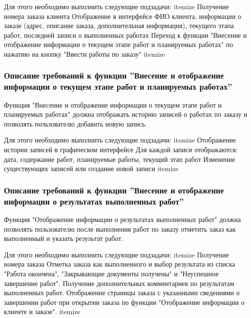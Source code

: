 \documentclass[russian, utf8, 12pt,pointsubsection,floatsubsection]{eskdtext}
\begin{document}
Для этого необходимо выполнить следующие подзадачи:
itemize
Получение номера заказа клиента
Отображение в интерфейсе ФИО клиента, информации о заказе (адрес, описание заказа, дополнительная информация), текущего этапа работ, последней записи о выполненных работах
Переход к функции "Внесение и отображение информации о текущем этапе работ и планируемых работах" по нажатию на кнопку "Ввести работы по заказу"
itemize

\subsubsection{Описание требований к функции ''Внесение и отображение информации о текущем этапе работ и планируемых работах''}
Функция "Внесение и отображение информации о текущем этапе работ и планируемых работах" должна отображать историю записей о работах по заказу и позволять пользователю добавить новую запись. 

Для этого необходимо выполнить следующие подзадачи:
itemize
Отображение истории записей в графическом интерфейсе
Для каждой записи отображаются: дата, содержание работ, планируемые работы, текущий этап работ
Изменение существующих записей или создание новой записи
itemize

\subsubsection{Описание требований к функции ''Внесение и отображение информации о результатах выполненных работ''}
Функция "Отображение информации о результатах выполненных работ" должна позволять пользователю после выполнения работ по заказу отметить заказ как выполненный и указать результат работ.

Для этого необходимо выполнить следующие подзадачи:
itemize
Получение номера заказа
Отметка заказа как выполненного и выбор результата из списка "Работа окончена", "Закрывающие документы получены" и "Неуспешное завершение работ".
Получение дополнительных комментариев по результатам выполненных работ.
Отображение страницы заказа с указанными сведениями о завершении работ при открытии заказа по функции "Отображение информации о клиенте и заказе".
itemize


\end{document}
